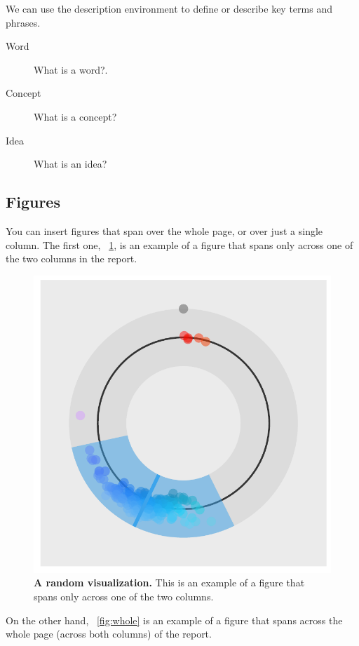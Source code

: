 \documentclass[fleqn,moreauthors,10pt]{ds_report}
\begin{document}
We can use the description environment to define or describe key terms and phrases.

\begin{description}
	\item[Word] What is a word?.
	\item[Concept] What is a concept?
	\item[Idea] What is an idea?
\end{description}

\subsection*{Figures}

You can insert figures that span over the whole page, or over just a single column. The first one, \figurename~\ref{fig:column}, is an example of a figure that spans only across one of the two columns in the report.

\begin{figure}[ht]\centering
	\includegraphics[width=\linewidth]{single_column.pdf}
	\caption{\textbf{A random visualization.} This is an example of a figure that spans only across one of the two columns.}
	\label{fig:column}
\end{figure}

On the other hand, \figurename~\ref{fig:whole} is an example of a figure that spans across the whole page (across both columns) of the report.
\end{document}
